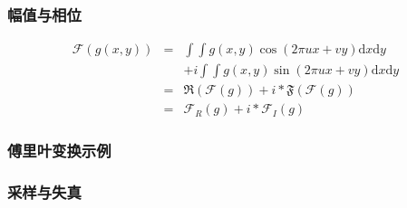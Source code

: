 \documentclass{beamer}
\newcommand{\mathd}{\mathrm{d}}
\newcommand{\nospace}{}
\begin{document}
{{\begin{frame}
\end{frame}}{\begin{frame}
  \frametitle{幅值与相位}
  \begin{eqnarray*}
    \mathcal{F} (g (x, y)) & = & \int \int g (x, y) \cos (2 \pi u \nospace x +
    v \nospace y) \mathd x \mathd y\\
    &  & + i \int \int g (x, y) \sin (2 \pi u \nospace x + v \nospace y)
    \mathd x \mathd y\\
    & = & \mathfrak{R} (\mathcal{F} (g)) + i \ast \mathfrak{F} (\mathcal{F}
    (g))\\
    & = & \mathcal{F}_R (g) + i \ast \mathcal{F}_I (g)
  \end{eqnarray*}
\end{frame}}{\begin{frame}
  \frametitle{傅里叶变换示例}
  
  {\hspace{3em}}
\end{frame}}{\begin{frame}
  \frametitle{采样与失真}
  

\end{frame}}}
\end{document}
